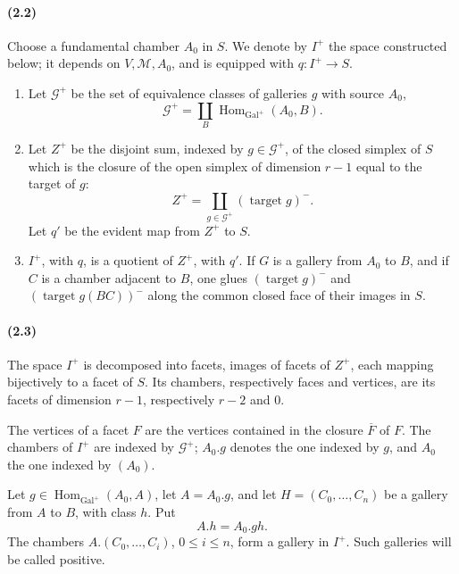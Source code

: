 \documentclass[10pt]{article}
\begin{document}
\paragraph{(2.2)} Choose a fundamental chamber \(A_0\) in \(S\). We denote by \(I^+\) the space constructed below; it depends on \(V,\mathcal M,A_0\), and is equipped with \(q:I^+\to S\).
\begin{enumerate}[label=\alph*)]
\item Let \(\mathcal G^+\) be the set of equivalence classes of galleries \(g\) with source \(A_0\),
\[
\mathcal G^+=\coprod_B\operatorname{Hom}_{\operatorname{Gal}^+}(A_0,B).
\]
\item Let \(Z^+\) be the disjoint sum, indexed by \(g\in\mathcal G^+\), of the closed simplex of \(S\) which is the closure of the open simplex of dimension \(r-1\) equal to the target of \(g\):
\[
Z^+=\coprod_{g\in\mathcal G^+}(\operatorname{target}g)^{-}.
\]
Let \(q'\) be the evident map from \(Z^+\) to \(S\).
\item \(I^+\), with \(q\), is a quotient of \(Z^+\), with \(q'\). If \(G\) is a gallery from \(A_0\) to \(B\), and if \(C\) is a chamber adjacent to \(B\), one glues \((\operatorname{target}g)^{-}\) and \((\operatorname{target}g(BC))^{-}\) along the common closed face of their images in \(S\).
\end{enumerate}

\paragraph{(2.3)} The space \(I^+\) is decomposed into facets, images of facets of \(Z^+\), each mapping bijectively to a facet of \(S\). Its chambers, respectively faces and vertices, are its facets of dimension \(r-1\), respectively \(r-2\) and \(0\).

The vertices of a facet \(F\) are the vertices contained in the closure \(\overline F\) of \(F\). The chambers of \(I^+\) are indexed by \(\mathcal G^+\); \(A_0.g\) denotes the one indexed by \(g\), and \(A_0\) the one indexed by \((A_0)\).

Let \(g\in\operatorname{Hom}_{\operatorname{Gal}^+}(A_0,A)\), let \(A=A_0.g\), and let \(H=(C_0,\ldots,C_n)\) be a gallery from \(A\) to \(B\), with class \(h\). Put
\[
A.h=A_0.gh.
\]
The chambers \(A.(C_0,\ldots,C_i)\), \(0\le i\le n\), form a gallery in \(I^+\). Such galleries will be called positive.
\end{document}
